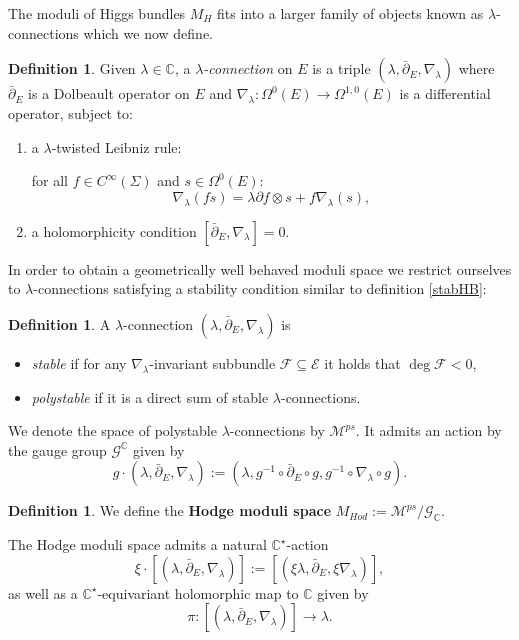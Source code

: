 \documentclass[12pt,oneside,reqno]{amsart}
\theoremstyle{definition}
\newtheorem{definition}[theorem]{Definition}
\numberwithin{equation}{section}
\numberwithin{theorem}{section}
\newcommand{\C}{\mathbb{C}}
\renewcommand{\subset}{\subseteq}
\newcommand{\pa}{\partial}
\newcommand{\del}{\partial}
\newcommand{\delbar}{\bar\pa}
\begin{document}
The moduli of Higgs bundles $M_H$ fits into a larger family of objects known as $\lambda$-connections which we now define. 

%
\begin{definition}
Given $\lambda \in \C$, a \textit{$\lambda$-connection} on $E$ is a triple $(\lambda, \delbar_E , \nabla_\lambda)$ where $\delbar_E$ is a Dolbeault operator on $E$ and $\nabla_\lambda : \Omega^0 (E) \rightarrow \Omega^{1,0}(E)$ is a differential operator, subject to:
\begin{enumerate}[label = (\roman*)]
\item a $\lambda$-twisted Leibniz rule: 
    
for all $f \in C^\infty (\Sigma)$ and $s \in \Omega^0 (E)$:
\begin{equation*}
        \nabla_\lambda (fs) = \lambda \partial f \otimes s + f \nabla_\lambda(s),
\end{equation*} 
    \item a holomorphicity condition $[ \delbar_E , \nabla_\lambda ] = 0$.
\end{enumerate}
\end{definition}
%
In order to obtain a geometrically well behaved moduli space we restrict ourselves to $\lambda$-connections satisfying a stability condition similar to definition \ref{stabHB}:
%
\begin{definition}
A $\lambda$-connection $(\lambda, \bar\pa_E, \nabla_{\lambda})$ is 
\begin{itemize}
    \item \textit{stable} if for any $\nabla_{\lambda}$-invariant subbundle $\mathcal F\subset \mathcal E$ it holds that $\deg \mathcal F < 0$,
    \item \textit{polystable} if it is a direct sum of stable $\lambda$-connections.
\end{itemize}
\end{definition}
% 
We denote the space of polystable $\lambda$-connections by $\mathcal M^{ps}$. It admits an action by the gauge group $\mathcal G^{\C}$ given by 
%
\begin{equation*}
    g\cdot (\lambda,\bar \del _E,\nabla_{\lambda}):=(\lambda,g^{-1}\circ\bar \del_E \circ g, g^{-1}\circ \nabla_{\lambda} \circ g).
\end{equation*}
%

%
\begin{definition}
We define the \textbf{Hodge moduli space} $M_{Hod}:= \mathcal M^{ps}/\mathcal G_{\mathbb C}$. 
\end{definition}
%
The Hodge moduli space admits a natural $\mathbb C^{\star}$-action  
%
\begin{equation}\label{CSA}
    \xi\cdot [(\lambda,\bar\pa_E,\nabla_{\lambda})]:= [(\xi\lambda,\bar\pa_E,\xi\nabla_{\lambda})],
\end{equation}
%
as well as a $\C ^\star$-equivariant holomorphic map to $\C$ given by 
\begin{equation*}
  \pi: [(\lambda, \bar\pa_E,\nabla_{\lambda})]\to \lambda .  
\end{equation*}
\end{document}
